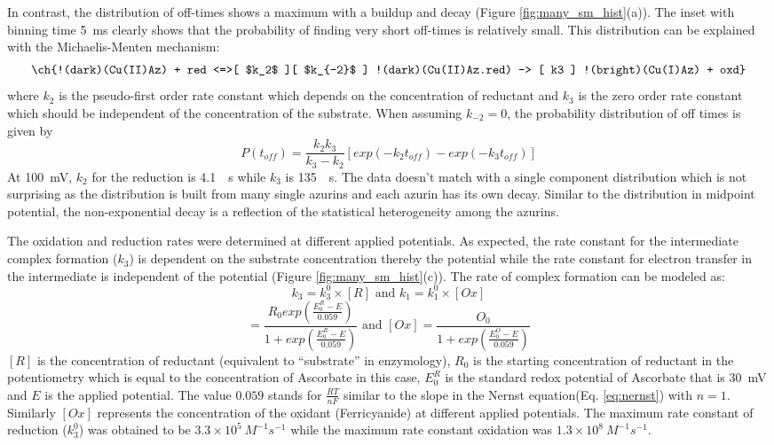In contrast, the distribution of off-times shows a maximum with a buildup and decay (Figure \ref{fig:many_sm_hist}(a)).
The inset with binning time \SI{5}{\ms} clearly shows that the probability of finding very short off-times is relatively small.
This distribution can be explained with the Michaelis-Menten mechanism:
\begin{align}
	\ch{!(dark)(Cu(II)Az) + red <=>[ $k_2$ ][ $k_{-2}$ ] !(dark)(Cu(II)Az.red) -> [ k3 ] !(bright)(Cu(I)Az) + oxd}
	\label{eq:reduction}
\end{align}
where $k_2$ is the pseudo-first order rate constant which depends on the concentration of reductant and $k_3$ is the zero order rate constant which should be independent of the concentration of the substrate.
When assuming $k_{-2}=0$, the probability distribution of off times is given by\cite{lu1998single-molecule}
\begin{equation}
	P(t_{off}) = \frac{k_2k_3}{k_3-k_2} [exp(-k_2t_{off})-exp(-k_3t_{off})]
	\label{eq:2exp_risetime}
\end{equation}
At \SI{100}{\mV}, $k_2$ for the reduction is \SI{4.1}{\per\s} while $k_3$ is \SI{135}{\per\s}.
The data doesn't match with a single component distribution which is not surprising as the distribution is built from many single azurins and each azurin has its own decay.
Similar to the distribution in midpoint potential, the non-exponential decay is a reflection of the statistical heterogeneity among the azurins.

The oxidation and reduction rates were determined at different applied potentials.
As expected, the rate constant for the intermediate complex formation ($k_3$) is dependent on the substrate concentration thereby the potential while the rate constant for electron transfer in the intermediate is independent of the potential (Figure \ref{fig:many_sm_hist}(c)).
The rate of complex formation can be modeled as:
\begin{equation}
	k_3 =k_3^0\times[R] \text{ and } k_1 =k_1^0\times[Ox]
	\label{eq:rate_complex}
\end{equation}
\begin{equation}
	[R] = \frac{R_0exp(\frac{E_0^R-E}{0.059})}{1+exp(\frac{E_0^R-E}{0.059})}
	\text{ and } [Ox] = \frac{O_0}{1+exp(\frac{E_0^O-E}{0.059})}
	\label{eq:conc_potential}
\end{equation}
$[R]$ is the concentration of reductant (equivalent to ``substrate'' in enzymology), $R_0$ is the starting concentration of reductant in the potentiometry which is equal to the concentration of Ascorbate in this case, $E_0^R$ is the standard redox potential of Ascorbate that is \SI{30}{\mV} and $E$ is the applied potential. The value $0.059$ stands for $\frac{RT}{nF}$ similar to the slope in the Nernst equation(Eq. \ref{eq:nernst}) with $n=1$.
Similarly $[Ox]$ represents the concentration of the oxidant (Ferricyanide) at different applied potentials.
The maximum rate constant of reduction ($k_3^0$) was obtained to be $3.3\times10^5~M^{-1}s^{-1}$ while the maximum rate constant oxidation was $1.3\times10^8~M^{-1}s^{-1}$.

